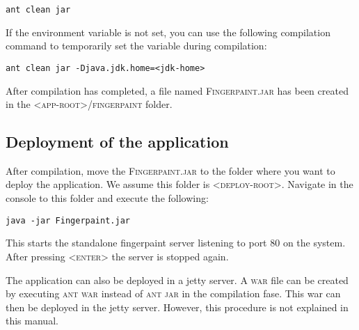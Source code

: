 \begin{verbatim}
ant clean jar
\end{verbatim}

If the environment variable is not set, you can use the following compilation command to temporarily set the variable during compilation:

\begin{verbatim}
ant clean jar -Djava.jdk.home=<jdk-home>
\end{verbatim}

After compilation has completed, a file named \textsc{Fingerpaint.jar} has been created in the \textsc{<app-root>/fingerpaint} folder.

\subsection{Deployment of the application}
After compilation, move the \textsc{Fingerpaint.jar} to the folder where you want to deploy the application. We assume this folder is \textsc{<deploy-root>}. Navigate in the console to this folder and execute the following:

\begin{verbatim}
java -jar Fingerpaint.jar
\end{verbatim}

This starts the standalone fingerpaint server listening to port 80 on the system. After pressing \textsc{<enter>} the server is stopped again.

The application can also be deployed in a jetty server. A \textsc{war} file can be created by executing \textsc{ant war} instead of \textsc{ant jar} in the compilation fase. This war can then be deployed in the jetty server. However, this procedure is not explained in this manual.